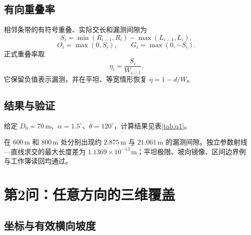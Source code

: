 \documentclass[UTF8,a4paper,12pt]{ctexart}
\newcommand{\m}{\,\mathrm{m}}
\newcommand{\degree}{^\circ}
\begin{document}
\subsection{有向重叠率}

相邻条带的有符号重叠、实际交长和漏测间隙为
\begin{equation}
S_i=\min(R_{i-1},R_i)-\max(L_{i-1},L_i),
\end{equation}
\begin{equation}
O_i=\max(0,S_i),\qquad G_i=\max(0,-S_i).
\end{equation}
正式重叠率取
\begin{equation}
\eta_i=\frac{S_i}{W_{i-1}}.
\end{equation}
它保留负值表示漏测，并在平坦、等宽情形恢复 $\eta=1-d/W$。

\subsection{结果与验证}

给定 $D_0=70\m$、$\alpha=1.5\degree$、$\theta=120\degree$，计算结果见表\ref{tab:q1}。

\begin{table}[H]
\centering
\caption{第1问正式结果}
\label{tab:q1}
\end{table}

在 $600\m$ 和 $800\m$ 处分别出现约 $2.875\m$ 与 $21.061\m$ 的漏测间隙。独立参数射线—直线求交的最大长度差为 $1.1369\times10^{-13}\m$；平坦极限、坡向镜像、区间边界例与工作簿读回均通过。

\section{第2问：任意方向的三维覆盖}

\subsection{坐标与有效横向坡度}
\end{document}
